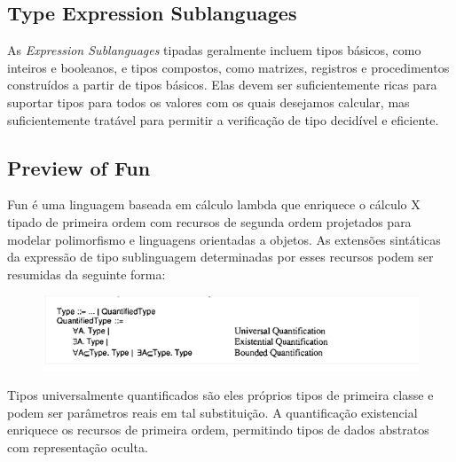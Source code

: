 \subsection{Type Expression Sublanguages}
As \textit{Expression Sublanguages} tipadas geralmente incluem tipos básicos, como inteiros e booleanos, e tipos compostos, como matrizes, registros e procedimentos construídos a partir de tipos básicos.
Elas devem ser suficientemente ricas para suportar tipos para todos os valores com os quais desejamos calcular, mas suficientemente tratável para permitir a verificação de tipo decidível e eficiente.

\subsection{Preview of Fun}
Fun é uma linguagem baseada em cálculo lambda que enriquece o cálculo X tipado de primeira ordem com recursos de segunda ordem projetados para modelar polimorfismo e linguagens orientadas a objetos.
As extensões sintáticas da expressão de tipo sublinguagem determinadas por esses recursos podem ser resumidas da seguinte forma:
\begin{figure}[h]
    \centering %
    \includegraphics[]{anexos/Screenshot_38.png}
\end{figure}
\par Tipos universalmente quantificados são eles próprios tipos de primeira classe e podem ser parâmetros reais em tal substituição.
A quantificação existencial enriquece os recursos de primeira ordem, permitindo tipos de dados abstratos com representação oculta.